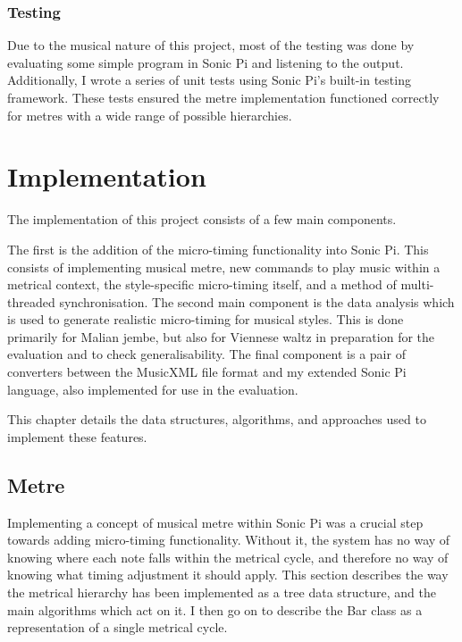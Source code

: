 \documentclass[12pt,twoside,openright]{report}
\begin{document}
\subsection{Testing}

Due to the musical nature of this project, most of the testing was done by
evaluating some simple program in Sonic Pi and listening to the output.
Additionally, I wrote a series of unit tests using Sonic Pi's built-in testing
framework. These tests ensured the metre implementation functioned correctly for
metres with a wide range of possible hierarchies.





\chapter{Implementation} \label{implementation}

The implementation of this project consists of a few main components.

The first is the addition of the micro-timing functionality into Sonic Pi.
This consists of implementing musical metre, new commands to play music
within a metrical context, the style-specific micro-timing itself, and a method
of multi-threaded synchronisation. The second main component is the data
analysis which is used to generate realistic micro-timing for musical styles.
This is done primarily for Malian jembe, but also for Viennese waltz in
preparation for the evaluation and to check generalisability. The final component is a 
pair of converters between the MusicXML file format and my extended Sonic Pi language, 
also implemented for use in the evaluation.

This chapter details the data structures, algorithms, and approaches used to
implement these features.



\section{Metre} \label{metre_implementation}

Implementing a concept of musical metre within Sonic Pi was a crucial step
towards adding micro-timing functionality. Without it, the system has no way of
knowing where each note falls within the metrical cycle, and therefore no way of
knowing what timing adjustment it should apply. This section describes the way
the metrical hierarchy has been implemented as a tree data structure, and the
main algorithms which act on it. I then go on to describe the Bar class as a
representation of a single metrical cycle.
\end{document}
